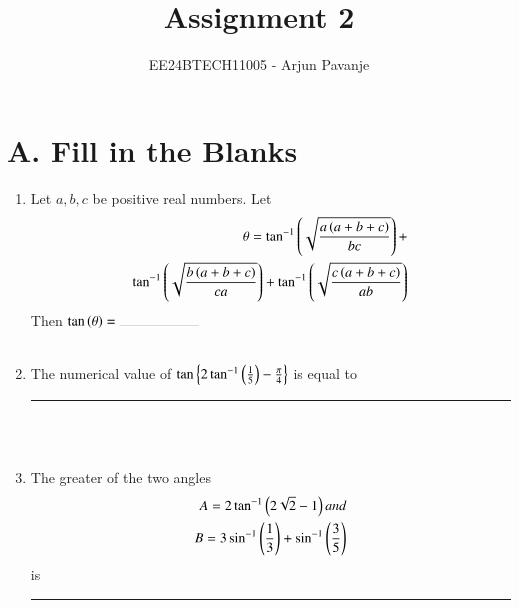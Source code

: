 \documentclass[journal,12pt,twocolumn,article]{IEEEtran}
\theoremstyle{remark}
\begin{document}

\vspace{3cm}

\title{Assignment 2}
\author{EE24BTECH11005 - Arjun Pavanje}
\maketitle
\newpage
\bigskip

\renewcommand{\thefigure}{\theenumi}
\renewcommand{\thetable}{\theenumi}
\section*{A. Fill in the Blanks}
\begin{enumerate}
\item Let $a,b,c$ be positive real numbers. Let
\begin{align*}
\theta = \tan ^{-1}\left(\sqrt{\frac{a\left(a+b+c\right)}{bc}}\right) + \\ \tan ^{-1}\left(\sqrt{\frac{b\left(a+b+c\right)}{ca}}\right) + \tan ^{-1}\left(\sqrt{\frac{c\left(a+b+c\right)}{ab}}\right) 
\end{align*}
Then $\tan \brak{\theta}= \rule{2cm}{0.1pt}$ 
\hfill {}\\\\
\item The numerical value of $\tan \left\{ 2\tan ^{-1}\left(\frac{1}{5}\right)-\frac{\pi}{4}\right\}$ is equal to \rule{2cm}{0.1pt}
\hfill {}\\\\
\item The greater of the two angles 
\begin{align*}
A = 2 \tan ^{-1}\left(2\sqrt{2}-1\right) and\\
B = 3\sin ^{-1}\left(\frac{1}{3}\right) + \sin ^{-1}\left(\frac{3}{5}\right)
\end{align*}
is \rule{2cm}{0.1pt}
\hfill {}\\\\
\end{enumerate}
\end{document}
